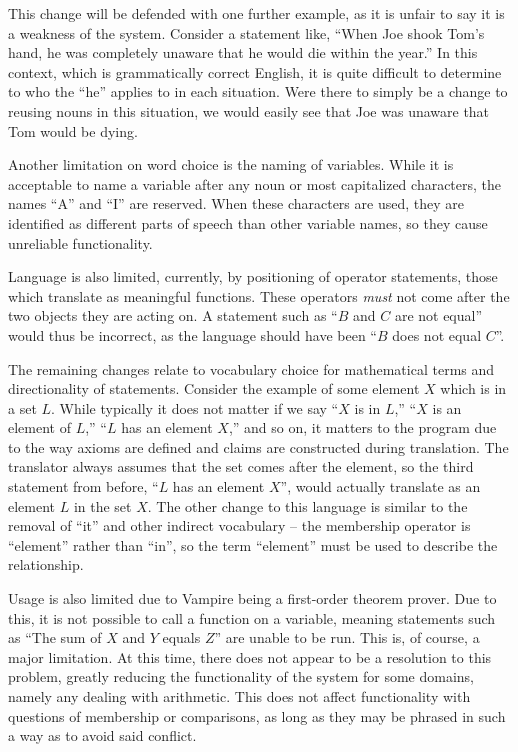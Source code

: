 This change will be defended with one further example, as it is unfair to say it is a weakness of the system. Consider a statement like, ``When Joe shook Tom's hand, he was completely unaware that he would die within the year.'' In this context, which is grammatically correct English, it is quite difficult to determine to who the ``he'' applies to in each situation. Were there to simply be a change to reusing nouns in this situation, we would easily see that Joe was unaware that Tom would be dying.

Another limitation on word choice is the naming of variables. While it is acceptable to name a variable after any noun or most capitalized characters, the names ``A'' and ``I'' are reserved. When these characters are used, they are identified as different parts of speech than other variable names, so they cause unreliable functionality.

Language is also limited, currently, by positioning of operator statements, those which translate as meaningful functions. These operators \textit{must} not come after the two objects they are acting on. A statement such as ``$B$ and $C$ are not equal'' would thus be incorrect, as the language should have been ``$B$ does not equal $C$''.

The remaining changes relate to vocabulary choice for mathematical terms and directionality of statements. Consider the example of some element $X$ which is in a set $L$. While typically it does not matter if we say ``$X$ is in $L$,'' ``$X$ is an element of $L$,'' ``$L$ has an element $X$,'' and so on, it matters to the program due to the way axioms are defined and claims are constructed during translation. The translator always assumes that the set comes after the element, so the third statement from before, ``$L$ has an element $X$'', would actually translate as an element $L$ in the set $X$. The other change to this language is similar to the removal of ``it'' and other indirect vocabulary -- the membership operator is ``element'' rather than ``in'', so the term ``element'' must be used to describe the relationship.

Usage is also limited due to Vampire being a first-order theorem prover. Due to this, it is not possible to call a function on a variable, meaning statements such as ``The sum of $X$ and $Y$ equals $Z$'' are unable to be run. This is, of course, a major limitation. At this time, there does not appear to be a resolution to this problem, greatly reducing the functionality of the system for some domains, namely any dealing with arithmetic. This does not affect functionality with questions of membership or comparisons, as long as they may be phrased in such a way as to avoid said conflict.

